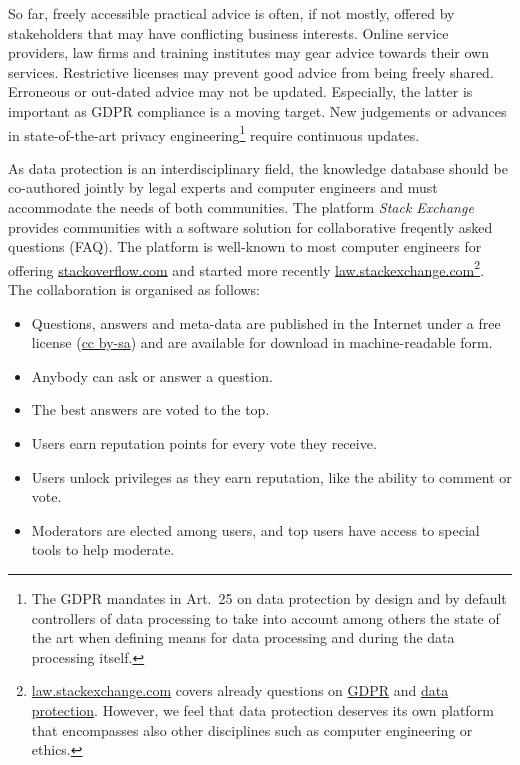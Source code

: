 \documentclass{scrlttr2}
\let\tightlist\relax
\begin{document}
\begin{letter}{}
So far, freely accessible practical advice is often, if not mostly,
offered by stakeholders that may have conflicting business interests.
Online service providers, law firms and training institutes may gear
advice towards their own services. Restrictive licenses may prevent good
advice from being freely shared. Erroneous or out-dated advice may not
be updated. Especially, the latter is important as GDPR compliance is a
moving target. New judgements or advances in state-of-the-art privacy
engineering\footnote{The GDPR mandates in Art.~25 on data protection by
  design and by default controllers of data processing to take into
  account among others the state of the art when defining means for data
  processing and during the data processing itself.} require continuous
updates.

As data protection is an interdisciplinary field, the knowledge database
should be co-authored jointly by legal experts and computer engineers
and must accommodate the needs of both communities. The platform \emph{Stack
Exchange} provides communities with a software solution for collaborative
freqently asked questions (FAQ). The platform is well-known to most
computer engineers for offering
\href{https://stackoverflow.com}{stackoverflow.com} and started more
recently
\href{https://law.stackexchange.com}{law.stackexchange.com}\footnote{\href{https://law.stackexchange.com}{law.stackexchange.com}
  covers already questions on
  \href{https://law.stackexchange.com/questions/tagged/gdpr}{GDPR} and
  \href{https://law.stackexchange.com/questions/tagged/gdpr+data-protection}{data
  protection}. However, we feel that data protection deserves its own
  platform that encompasses also other disciplines such as computer
  engineering or ethics.}. The collaboration is organised as follows:

\begin{itemize}
\tightlist
\item
  Questions, answers and meta-data are published in the Internet under a
  free license
  (\href{https://creativecommons.org/licenses/by-sa/3.0/}{cc by-sa}) and
  are available for download in machine-readable form.
\item
  Anybody can ask or answer a question.
\item
  The best answers are voted to the top.
\item
  Users earn reputation points for every vote they receive.
\item
  Users unlock privileges as they earn reputation, like the ability to
  comment or vote.
\item
  Moderators are elected among users, and top users have access to
  special tools to help moderate.
\end{itemize}


\end{letter}
\end{document}
